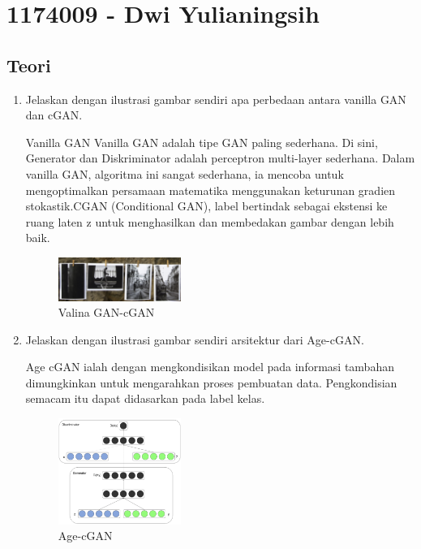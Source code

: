\section{1174009 - Dwi Yulianingsih}

\subsection{Teori}
\begin{enumerate}

        \item Jelaskan dengan ilustrasi gambar sendiri apa perbedaan antara vanilla GAN dan cGAN.

Vanilla GAN Vanilla GAN adalah tipe GAN paling sederhana. Di sini, Generator dan Diskriminator adalah perceptron multi-layer sederhana. Dalam vanilla GAN, algoritma ini sangat sederhana, ia mencoba untuk mengoptimalkan persamaan matematika menggunakan keturunan gradien stokastik.CGAN (Conditional GAN), label bertindak sebagai ekstensi ke ruang laten z untuk menghasilkan dan membedakan gambar dengan lebih baik. 

	\begin{figure}[H]
            	\includegraphics[width=4cm]{figures/1174009/9/teori1.PNG}
           	\centering
           	\caption{Valina GAN-cGAN}
        	\end{figure}

        \item Jelaskan dengan ilustrasi gambar sendiri arsitektur dari Age-cGAN.

Age cGAN ialah dengan mengkondisikan model pada informasi tambahan dimungkinkan untuk mengarahkan proses pembuatan data. Pengkondisian semacam itu dapat didasarkan pada label kelas.

	\begin{figure}[H]
		\includegraphics[width=4cm]{figures/1174009/9/teori2.PNG}
            	\centering
           	\caption{Age-cGAN}
       	 \end{figure}


\end{enumerate}

